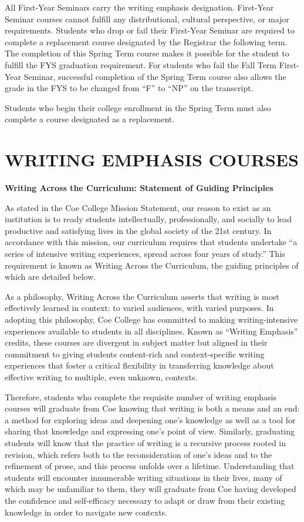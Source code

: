 \documentclass[
  letterpaper,
]{scrbook}
\begin{document}
All First-Year Seminars carry the writing emphasis designation.
First-Year Seminar courses cannot fulfill any distributional, cultural
perspective, or major requirements. Students who drop or fail their
First-Year Seminar are required to complete a replacement course
designated by the Registrar the following term. The completion of this
Spring Term course makes it possible for the student to fulfill the FYS
graduation requirement. For students who fail the Fall Term First-Year
Seminar, successful completion of the Spring Term course also allows the
grade in the FYS to be changed from ``F'' to ``NP'' on the transcript.

Students who begin their college enrollment in the Spring Term must also
complete a course designated as a replacement.

\hypertarget{writing-emphasis-courses}{%
\chapter{WRITING EMPHASIS COURSES}\label{writing-emphasis-courses}}

\textbf{Writing Across the Curriculum: Statement of Guiding Principles}

As stated in the Coe College Mission Statement, our reason to exist as
an institution is to ready students intellectually, professionally, and
socially to lead productive and satisfying lives in the global society
of the 21st century. In accordance with this mission, our curriculum
requires that students undertake ``a series of intensive writing
experiences, spread across four years of study.'' This requirement is
known as Writing Across the Curriculum, the guiding principles of which
are detailed below.

As a philosophy, Writing Across the Curriculum asserts that writing is
most effectively learned in context: to varied audiences, with varied
purposes. In adopting this philosophy, Coe College has committed to
making writing-intensive experiences available to students in all
disciplines. Known as ``Writing Emphasis'' credits, these courses are
divergent in subject matter but aligned in their commitment to giving
students content-rich and context-specific writing experiences that
foster a critical flexibility in transferring knowledge about effective
writing to multiple, even unknown, contexts.

Therefore, students who complete the requisite number of writing
emphasis courses will graduate from Coe knowing that writing is both a
means and an end: a method for exploring ideas and deepening one's
knowledge as well as a tool for sharing that knowledge and expressing
one's point of view. Similarly, graduating students will know that the
practice of writing is a recursive process rooted in revision, which
refers both to the reconsideration of one's ideas and to the refinement
of prose, and this process unfolds over a lifetime. Understanding that
students will encounter innumerable writing situations in their lives,
many of which may be unfamiliar to them, they will graduate from Coe
having developed the confidence and self-efficacy necessary to adapt or
draw from their existing knowledge in order to navigate new contexts.
\end{document}
